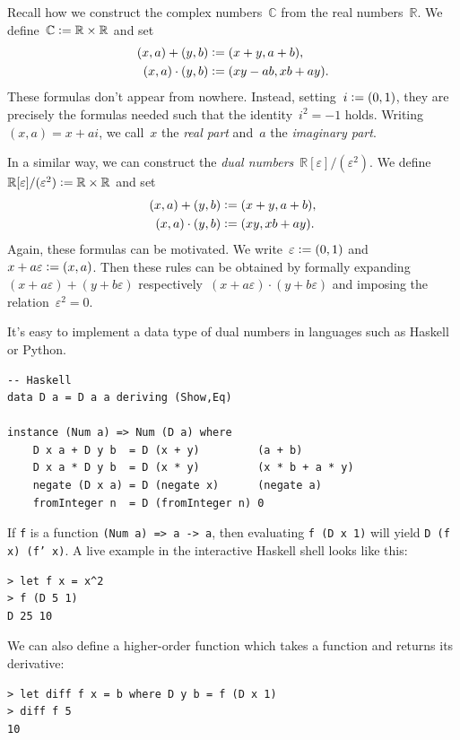 \documentclass[a4paper,ngerman,12pt]{scrartcl}
\theoremstyle{definition}
\theoremstyle{plain}
\theoremstyle{remark}
\newcommand{\RR}{\mathbb{R}}
\newcommand{\CC}{\mathbb{C}}
\newcommand{\DD}{\mathbb{R}[\varepsilon]/(\varepsilon^2)}
\newcommand{\defeq}{\vcentcolon=}
\begin{document}
Recall how we construct the complex numbers~$\CC$ from the real numbers~$\RR$.
We define~$\CC \defeq \RR \times \RR$ and set
\begin{align*}
  (x,a) + (y,b) &\defeq (x+y, a+b), \\
  (x,a) \cdot (y,b) &\defeq (xy - ab, xb+ay).
\end{align*}
These formulas don't appear from nowhere. Instead, setting~$i \defeq (0,1)$,
they are precisely the formulas needed such that the identity~$i^2 = -1$
holds. Writing~$(x,a) = x + ai$, we call~$x$ the \emph{real part} and~$a$ the
\emph{imaginary part}.

In a similar way, we can construct the \emph{dual
numbers}~$\DD$. We
define~$\DD \defeq \RR \times \RR$ and set
\begin{align*}
  (x,a) + (y,b) &\defeq (x+y, a+b), \\
  (x,a) \cdot (y,b) &\defeq (xy, xb+ay).
\end{align*}
Again, these formulas can be motivated. We write~$\varepsilon \defeq (0,1)$
and~$x + a \varepsilon \defeq (x,a)$. Then these rules can be obtained by
formally expanding~$(x + a \varepsilon) + (y + b \varepsilon)$ respectively~$(x
+ a \varepsilon) \cdot (y + b \varepsilon)$ and imposing the
relation~$\varepsilon^2 = 0$.

It's easy to implement a data type of dual numbers in languages such as Haskell
or Python.

\begin{verbatim}
-- Haskell
data D a = D a a deriving (Show,Eq)

instance (Num a) => Num (D a) where
    D x a + D y b  = D (x + y)         (a + b)
    D x a * D y b  = D (x * y)         (x * b + a * y)
    negate (D x a) = D (negate x)      (negate a)
    fromInteger n  = D (fromInteger n) 0
\end{verbatim}

If \texttt{f} is a function \texttt{(Num a) => a ->
a}, then evaluating \texttt{f (D x 1)} will yield
\texttt{D (f x) (f' x)}. A live example in the interactive Haskell
shell looks like this:

\begin{verbatim}> let f x = x^2
> f (D 5 1)
D 25 10
\end{verbatim}

We can also define a higher-order function which takes a function and returns
its derivative:

\begin{verbatim}> let diff f x = b where D y b = f (D x 1)
> diff f 5
10
\end{verbatim}
\end{document}
